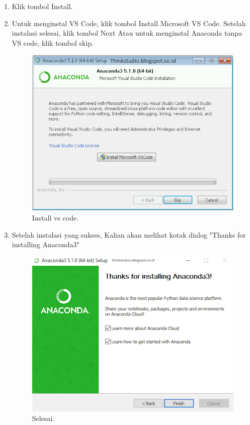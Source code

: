 \documentclass[lipt]{Article}
\begin{document}
\begin{enumerate}
\item Klik tombol Install. 

\item Untuk menginstal VS Code, klik tombol Install Microsoft VS Code. Setelah instalasi selesai, klik tombol Next Atau untuk menginstal Anaconda tanpa VS code, klik tombol skip. 
\begin{figure}[htbp]
\centerline{\includegraphics{chapters/gambar/3.png}}
\caption{Install vs code.}
\label{fig}
\end{figure}

\item Setelah instalasi yang sukses, Kalian akan melihat kotak dialog "Thanks for installing Anaconda3"
\begin{figure}[htbp]
\centerline{\includegraphics{chapters/gambar/4.png}}
\caption{Selesai.}
\label{fig}
\end{figure}

\end{enumerate}
\end{document}

